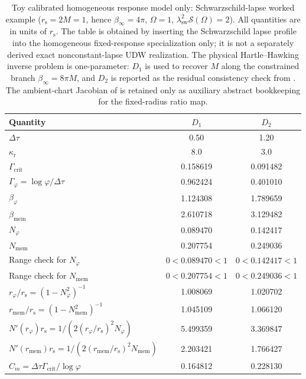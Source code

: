 \begin{table}[H]
\centering\small
\caption{Toy calibrated homogeneous response model only: Schwarzschild-lapse worked example ($r_{\mathrm s}=2M=1$, hence $\beta_\infty=4\pi$, $\Omega=1$, $\lambda_{\mathrm{sw}}^2\mathcal S(\Omega)=2$). All quantities are in units of $r_{\mathrm s}$. The table is obtained by inserting the Schwarzschild lapse profile into the homogeneous fixed-response specialization only; it is not a separately derived exact nonconstant-lapse UDW realization. The physical Hartle--Hawking inverse problem is one-parameter: $D_1$ is used to recover $M$ along the constrained branch $\beta_\infty=8\pi M$, and $D_2$ is reported as the residual consistency check from . The ambient-chart Jacobian of  is retained only as auxiliary abstract bookkeeping for the fixed-radius ratio map.}
\label{tab:worked}
\begin{tabular}{l c c}
\toprule
Quantity & $D_1$ & $D_2$ \\
\midrule
$\Delta\tau$ & 0.50 & 1.20 \\
$\kappa_{\mathrm r}$ & 8.0 & 3.0 \\
$\Gamma_{\mathrm{crit}}$ & 0.158619 & 0.091482 \\
$\Gamma_\varphi = \log\varphi/\Delta\tau$ & 0.962424 & 0.401010 \\
$\beta_\varphi$ & 1.124308 & 1.789659 \\
$\beta_{\mathrm{mem}}$ & 2.610718 & 3.129482 \\
$N_\varphi$ & 0.089470 & 0.142417 \\
$N_{\mathrm{mem}}$ & 0.207754 & 0.249036 \\
Range check for $N_\varphi$ & $0<0.089470<1$ & $0<0.142417<1$ \\
Range check for $N_{\mathrm{mem}}$ & $0<0.207754<1$ & $0<0.249036<1$ \\
$r_\varphi / r_{\mathrm s}=(1-N_\varphi^2)^{-1}$ & 1.008069 & 1.020702 \\
$r_{\mathrm{mem}} / r_{\mathrm s}=(1-N_{\mathrm{mem}}^2)^{-1}$ & 1.045109 & 1.066120 \\
$N'(r_\varphi)r_{\mathrm s}=1/(2(r_\varphi/r_{\mathrm s})^2N_\varphi)$ & 5.499359 & 3.369847 \\
$N'(r_{\mathrm{mem}})r_{\mathrm s}=1/(2(r_{\mathrm{mem}}/r_{\mathrm s})^2N_{\mathrm{mem}})$ & 2.203421 & 1.766427 \\
$C_m = \Delta\tau\Gamma_{\mathrm{crit}} / \log\varphi$ & 0.164812 & 0.228130 \\

\end{tabular}
\end{table}
